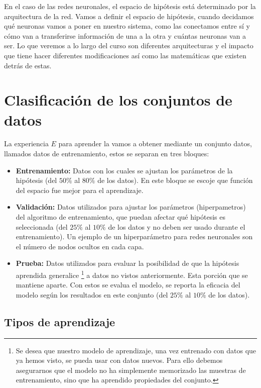 En el caso de las redes neuronales, el espacio de hipótesis está determinado por la arquitectura de la red.
Vamos a definir el espacio de hipótesis, cuando decidamos qué neuronas vamos a poner en nuestro sistema, como las conectamos entre sí y cómo van a transferirse información de una a la otra y cuántas neuronas van a ser. Lo que veremos a lo largo del curso son diferentes arquitecturas y el impacto que tiene hacer diferentes modificaciones así como las matemáticas que existen detrás de estas. 

\section{Clasificación de los conjuntos de datos}

La experiencia \(E\) para aprender la vamos a obtener mediante un conjunto datos, llamados datos de entrenamiento, estos se separan en tres bloques:

\begin{itemize}
 \item \textbf{Entrenamiento:} Datos con los cuales se ajustan los parámetros de la hipótesis (del \(50\%\) al \(80\%\) de los datos). En este bloque se escoje que función del espacio fue mejor para el aprendizaje.
 
 \item \textbf{Validación:} Datos utilizados para ajustar los parámetros (hiperpametros) del algoritmo de entrenamiento, que puedan afectar qué hipótesis es seleccionada (del \(25\%\) al \(10\%\) de los datos y no deben ser usado durante el entrenamiento). Un ejemplo de un hiperparámetro para redes neuronales son el número de nodos ocultos en cada capa.

 \item \textbf{Prueba:} Datos utilizados para evaluar la posibilidad de que la hipótesis aprendida generalice \footnote{Se desea que nuestro modelo de aprendizaje, una vez entrenado con datos que ya hemos visto, se pueda usar con datos nuevos. Para ello debemos asegurarnos que el modelo no ha simplemente memorizado las muestras de entrenamiento, sino que ha aprendido propiedades del conjunto.} a datos no vistos anteriormente. Esta porción que se mantiene aparte. Con estos se evalua el modelo, se reporta la eficacia del modelo según los resultados en este conjunto (del \(25\%\) al \(10\%\) de los datos).

\end{itemize}

\subsection{Tipos de aprendizaje}

